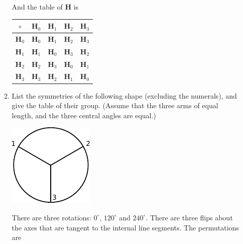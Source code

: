 \documentclass[twoside]{amsart}
\begin{document}
\begin{enumerate}[A.]
\begin{enumerate}[1]
      And the table of \textbf{H} is
      \vspace{5pt}
      \begin{tabular}{c|cccc}
        $\circ$         & $\textbf{H}_0$ & $\textbf{H}_1$ & $\textbf{H}_2$ &
	          $\textbf{H}_3$ \\ \hline
	$\textbf{H}_0$ & $\textbf{H}_0$ & $\textbf{H}_1$ & $\textbf{H}_2$ &
	          $\textbf{H}_3$\\
	$\textbf{H}_1$ & $\textbf{H}_1$ & $\textbf{H}_0$ & $\textbf{H}_3$ &
	          $\textbf{H}_2$\\
	$\textbf{H}_2$ & $\textbf{H}_2$ & $\textbf{H}_3$ & $\textbf{H}_0$ &
	          $\textbf{H}_1$\\
	$\textbf{H}_3$ & $\textbf{H}_3$ & $\textbf{H}_2$ & $\textbf{H}_1$ &
	          $\textbf{H}_0$\\
      \end{tabular}

      \item List the symmetries of the following shape (excluding the
      numerals), and give the
      table of their group. (Assume that the three arms of equal length,
      and the three central angles are equal.)


      \begin{center}
      \includegraphics{img/chap7f4.pdf}
      \end{center}

      \vspace{5pt}
      There are three rotations: $0^\circ$, $120^\circ$ and $240^\circ$.
      There are three flips about the axes that are tangent to the 
      internal line segments. The permutations are


\end{enumerate}
\end{enumerate}
\end{document}
